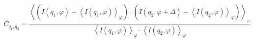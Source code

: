 \documentclass[12pt]{article}
\begin{document}
\begin{equation*}\label{xcca}
C_{q_1,q_2} = \frac{\left\langle \left(I(q_1,\varphi)-\left\langle I(q_1,\varphi)\right\rangle_{\varphi}\right)\cdot\left(I(q_2,\varphi+\Delta)-\left\langle I(q_2,\varphi)\right\rangle_{\varphi}\right)\right\rangle_{\varphi}}{\left\langle I(q_1,\varphi)\right\rangle_{\varphi}\cdot\left\langle I(q_2,\varphi)\right\rangle_{\varphi}}
\end{equation*}
\end{document}
